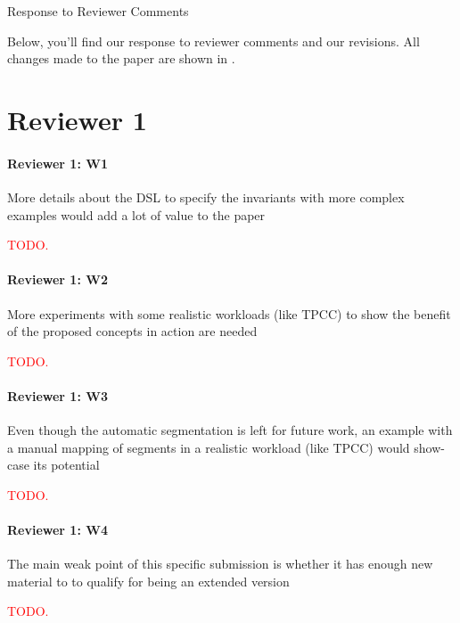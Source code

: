 \documentclass[9pt]{article}
\begin{document}
\begin{center}
  \ttlfnt Response to Reviewer Comments
\end{center}

\begin{multicols*}{2}
Below, you'll find our response to reviewer comments and our revisions. All
changes made to the paper are shown in .

\section*{Reviewer 1}
\paragraph{Reviewer 1: W1}
\begin{feedback}
  More details about the DSL to specify the invariants with more complex
  examples would add a lot of value to the paper
\end{feedback}
\textcolor{red}{TODO.}

\paragraph{Reviewer 1: W2}
\begin{feedback}
  More experiments with some realistic workloads (like TPCC) to show the
  benefit of the proposed concepts in action are needed
\end{feedback}
\textcolor{red}{TODO.}

\paragraph{Reviewer 1: W3}
\begin{feedback}
  Even though the automatic segmentation is left for future work, an example
  with a manual mapping of segments in a realistic workload (like TPCC) would
  show-case its potential
\end{feedback}
\textcolor{red}{TODO.}

\paragraph{Reviewer 1: W4}
\begin{feedback}
  The main weak point of this specific submission is whether it has enough new
  material to to qualify for being an extended version
\end{feedback}
\textcolor{red}{TODO.}


\end{multicols*}
\end{document}
